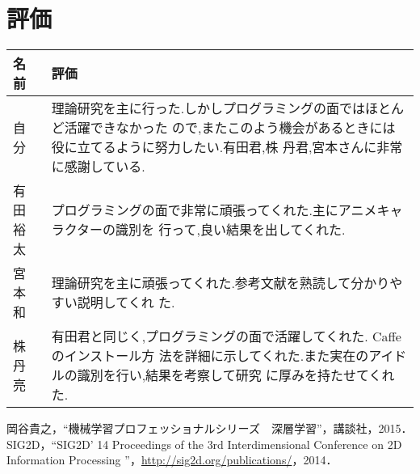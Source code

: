 \documentclass[a4paper,10pt]{jsarticle}
\begin{document}
\section{評価}
\label{sec:評価}
\begin{table}[H]
  \begin{center}
    \begin{tabular}{l|p{12cm}} \hline
      名前 & 評価 \\ \hline \hline
      自分 & 理論研究を主に行った.しかしプログラミングの面ではほとんど活躍できなかった
ので,またこのよう機会があるときには役に立てるように努力したい.有田君,株
丹君,宮本さんに非常に感謝している. \\ \hline
      有田 裕太 & プログラミングの面で非常に頑張ってくれた.主にアニメキャラクターの識別を
行って,良い結果を出してくれた. \\ \hline
      宮本 和 & 理論研究を主に頑張ってくれた.参考文献を熟読して分かりやすい説明してくれ
た. \\ \hline
      株丹 亮 & 有田君と同じく,プログラミングの面で活躍してくれた. Caffe のインストール方
法を詳細に示してくれた.また実在のアイドルの識別を行い,結果を考察して研究
に厚みを持たせてくれた.\\ \hline
    \end{tabular}
  \end{center}
\end{table}


\begin{thebibliography}{99}
  岡谷貴之，``機械学習プロフェッショナルシリーズ　深層学習''，講談社，2015．
  SIG2D，``SIG2D' 14 Proceedings of the 3rd Interdimensional Conference on 2D Information Processing ''，\url{http://sig2d.org/publications/}，2014．
 \end{thebibliography}
\end{document}
